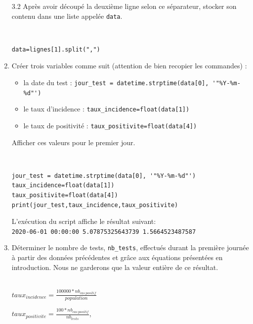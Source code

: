 \begin{enumerate}
\item[3.2] Après avoir découpé la deuxième ligne selon ce séparateur, stocker son contenu dans une liste appelée \verb?data?. 

 \begin{solution}~\ \\
\begin{verbatim}
data=lignes[1].split(",")
 \end{verbatim}
\end{solution}

\setcounter{enumi}{3}
\item Créer trois variables comme suit (attention de bien recopier les commandes) :
\begin{itemize}
 \item la date du test : \verb?jour_test = datetime.strptime(data[0], '"%Y-%m-%d"')?
 \item le taux d'incidence : \verb?taux_incidence=float(data[1])?
 \item le taux de positivité : \verb?taux_positivite=float(data[4])?
\end{itemize}

Afficher ces valeurs pour le premier jour.

 \begin{solution}~\ \\
\begin{verbatim}
jour_test = datetime.strptime(data[0], '"%Y-%m-%d"')
taux_incidence=float(data[1])
taux_positivite=float(data[4])
print(jour_test,taux_incidence,taux_positivite)
 \end{verbatim}
\end{solution}

L'exécution du script affiche le résultat suivant:\\
\verb?2020-06-01 00:00:00 5.07875325643739 1.5664523487587?

\item Déterminer le nombre de tests, \verb?nb_tests?, effectués durant la première journée à partir des données précédentes et grâce aux équations présentées en introduction. Nous ne garderons que la valeur entière de ce résultat.

 \begin{solution}~\ \\
$taux_{incidence}=\frac{100000*nb_{cas\ positif}}{population}$

$taux_{positivite}=\frac{100*nb_{cas\ positif}}{nb_{tests}}$,


\end{solution}
\end{enumerate}
